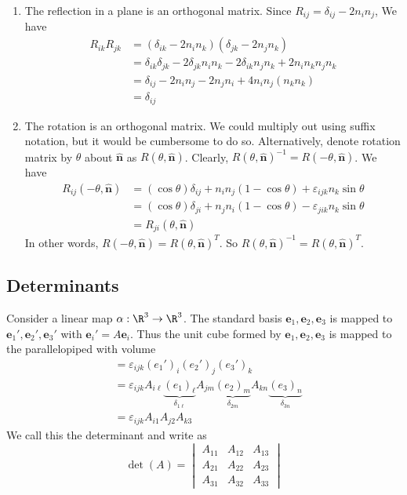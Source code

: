 \documentclass[a4paper]{article}
\begin{document}
\begin{eg}\leavevmode
  \begin{enumerate}
    \item The reflection in a plane is an orthogonal matrix. Since $R_{ij} = \delta_{ij} - 2n_in_j$, We have
      \begin{align*}
        R_{ik}R_{jk} &= (\delta_{ik} - 2n_in_k)(\delta_{jk} - 2n_jn_k)\\
        &= \delta_{ik}\delta_{jk} - 2\delta_{jk}n_in_k - 2\delta_{ik}n_jn_k + 2n_in_kn_jn_k\\
        &= \delta_{ij} - 2n_in_j - 2n_jn_i + 4n_in_j(n_kn_k)\\
        &= \delta_{ij}
      \end{align*}
    \item The rotation is an orthogonal matrix. We could multiply out using suffix notation, but it would be cumbersome to do so. Alternatively, denote rotation matrix by $\theta$ about $\mathbf{\hat n}$ as $R(\theta, \mathbf{\hat n})$. Clearly, $R(\theta, \mathbf{\hat n})^{-1} = R(-\theta, \mathbf{\hat n})$. We have
      \begin{align*}
        R_{ij}(-\theta, \mathbf{\hat n}) &= (\cos\theta)\delta_{ij} + n_in_j(1 - \cos\theta) + \varepsilon_{ijk}n_k\sin\theta\\
        &= (\cos\theta)\delta_{ji} + n_jn_i(1 - \cos\theta) - \varepsilon_{jik}n_k\sin\theta\\
        &= R_{ji}(\theta, \mathbf{\hat n})
      \end{align*}
      In other words, $R(-\theta, \mathbf{\hat n}) = R(\theta, \mathbf{\hat n})^T$. So $R(\theta, \mathbf{\hat n})^{-1} = R(\theta, \mathbf{\hat n})^T$.
  \end{enumerate}
\end{eg}

\subsection{Determinants}
Consider a linear map $\alpha: \R^3\to \R^3$. The standard basis $\mathbf{e}_1, \mathbf{e}_2, \mathbf{e}_3$ is mapped to $\mathbf{e}_1', \mathbf{e}_2', \mathbf{e}_3'$ with $\mathbf{e}_i' = A\mathbf{e}_i$. Thus the unit cube formed by $\mathbf{e}_1, \mathbf{e}_2, \mathbf{e}_3$ is mapped to the parallelopiped with volume
\begin{align*}
  [\mathbf{e}_1', \mathbf{e}_2', \mathbf{e}_3'] &= \varepsilon_{ijk}(e_1')_i (e_2')_j (e_3')_k\\
  &= \varepsilon_{ijk} A_{i\ell} \underbrace{(e_1)_\ell}_{\delta_{1\ell}} A_{jm}\underbrace{(e_2)_m}_{\delta_{2m}} A_{kn}\underbrace{(e_3)_n}_{\delta_{3n}}\\
  &= \varepsilon_{ijk} A_{i1}A_{j2}A_{k3}
\end{align*}
We call this the determinant and write as
\[
  \det(A) = \begin{vmatrix} A_{11} & A_{12} & A_{13}\\A_{21} & A_{22} & A_{23} \\ A_{31} & A_{32} & A_{33}\end{vmatrix}
\]
\end{document}
